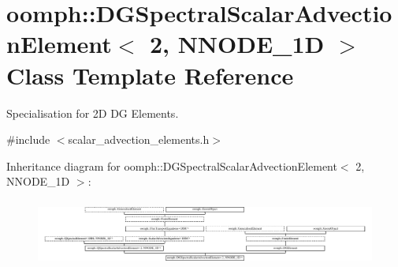 \hypertarget{classoomph_1_1DGSpectralScalarAdvectionElement_3_012_00_01NNODE__1D_01_4}{}\section{oomph\+:\+:D\+G\+Spectral\+Scalar\+Advection\+Element$<$ 2, N\+N\+O\+D\+E\+\_\+1D $>$ Class Template Reference}
\label{classoomph_1_1DGSpectralScalarAdvectionElement_3_012_00_01NNODE__1D_01_4}


Specialisation for 2D DG Elements.  




{\ttfamily \#include $<$scalar\+\_\+advection\+\_\+elements.\+h$>$}

Inheritance diagram for oomph\+:\+:D\+G\+Spectral\+Scalar\+Advection\+Element$<$ 2, N\+N\+O\+D\+E\+\_\+1D $>$\+:\begin{figure}[H]
\begin{center}
\leavevmode
\includegraphics[height=2.245989cm]{classoomph_1_1DGSpectralScalarAdvectionElement_3_012_00_01NNODE__1D_01_4}
\end{center}
\end{figure}
